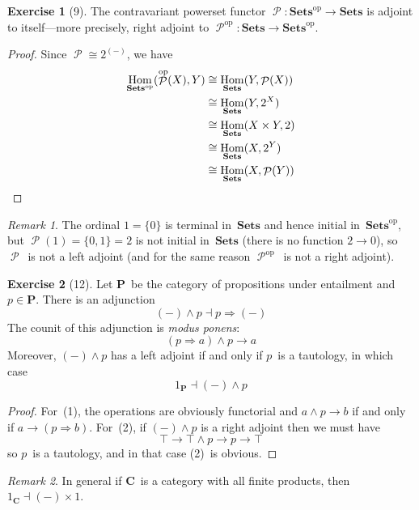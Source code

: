 \documentclass[letterpaper,12pt]{article}
\newcommand{\true}{\top}
\newcommand{\iso}{\cong}
\newcommand{\adj}{\dashv}
\newcommand{\limplies}{\Rightarrow}
\DeclareMathOperator{\Hom}{Hom}
\DeclareMathOperator{\pow}{\mathcal{P}}
\newcommand{\cat}[1]{\mathbf{#1}}
\newcommand{\dual}[1]{#1^{\mathrm{op}}}
\newcommand{\2}{\cat{2}}
\newcommand{\C}{\cat{C}}
\renewcommand{\P}{\cat{P}}
\newcommand{\Sets}{\cat{Sets}}
\newcommand{\Setsop}{\dual{\Sets}}
\theoremstyle{definition}
\newtheorem*{exer}{Exercise}
\theoremstyle{remark}
\newtheorem*{rmk}{Remark}
\theoremstyle{direction}
\begin{document}
\begin{exer}[9]
The contravariant powerset functor \(\pow:\Setsop\to\Sets\) is adjoint to itself---more precisely, right adjoint to \(\dual{\pow}:\Sets\to\Setsop\).
\end{exer}
\begin{proof}
Since \(\pow\iso2^{(-)}\), we have
\begin{align*}
\Hom_{\Setsop}(\dual{\pow}(X),Y)&\iso\Hom_{\Sets}(Y,\pow(X))\\
	&\iso\Hom_{\Sets}(Y,2^X)\\
	&\iso\Hom_{\Sets}(X\times Y,2)\\
	&\iso\Hom_{\Sets}(X,2^Y)\\
	&\iso\Hom_{\Sets}(X,\pow(Y))\qedhere
\end{align*}
\end{proof}
\begin{rmk}
The ordinal \(1=\{0\}\) is terminal in~\(\Sets\) and hence initial in~\(\Setsop\), but \(\pow(1)=\{0,1\}=2\) is not initial in~\(\Sets\) (there is no function \(2\to0\)), so \(\pow\)~is not a left adjoint (and for the same reason \(\dual{\pow}\)~is not a right adjoint).
\end{rmk}

\begin{exer}[12]
Let \(\P\)~be the category of propositions under entailment and \(p\in\P\). There is an adjunction
\[(-)\land p\adj p\limplies(-)\tag{1}\]
The counit of this adjunction is \emph{modus ponens}:
\[(p\limplies a)\land p\to a\]
Moreover, \((-)\land p\) has a left adjoint if and only if \(p\)~is a tautology, in which case
\[1_{\P}\adj(-)\land p\tag{2}\]
\end{exer}
\begin{proof}
For~(1), the operations are obviously functorial and \(a\land p\to b\) if and only if \(a\to(p\limplies b)\). For~(2), if \((-)\land p\) is a right adjoint then we must have
\[\true\to\true\land p\to p\to\true\]
so \(p\)~is a tautology, and in that case (2)~is obvious.
\end{proof}
\begin{rmk}
In general if \(\C\)~is a category with all finite products, then \(1_{\C}\adj(-)\times 1\).
\end{rmk}
\end{document}
